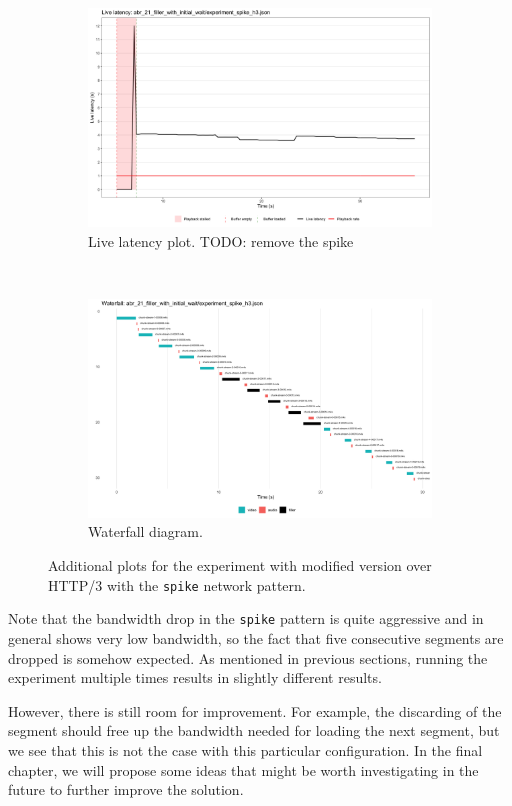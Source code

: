 \begin{figure}[h]
	\centering
	
	\begin{subfigure}[t]{0.45\textwidth}
		\centering
		\includegraphics[width=\textwidth]{res/impr_hls_filler_latency.png}
		\caption{Live latency plot. TODO: remove the spike}
		\label{fig:filler2_latency}
	\end{subfigure}%
	~ 
	\begin{subfigure}[t]{0.45\textwidth}
		\centering
		\includegraphics[width=\textwidth]{res/impr_hls_filler_waterfall.png}
		\caption{Waterfall diagram.}
		\label{fig:filler2_waterfall}
	\end{subfigure}
	
	\caption{Additional plots for the experiment with modified \hlsjs{} version over HTTP/3 with the \texttt{spike} network pattern.}
	\label{fig:filler2}
\end{figure}

Note that the bandwidth drop in the \texttt{spike} pattern is quite aggressive and in general shows very low bandwidth, so the fact that five consecutive segments are dropped is somehow expected. As mentioned in previous sections, running the experiment multiple times results in slightly different results.

However, there is still room for improvement. For example, the discarding of the segment should free up the bandwidth needed for loading the next segment, but we see that this is not the case with this particular configuration. In the final chapter, we will propose some ideas that might be worth investigating in the future to further improve the solution.


